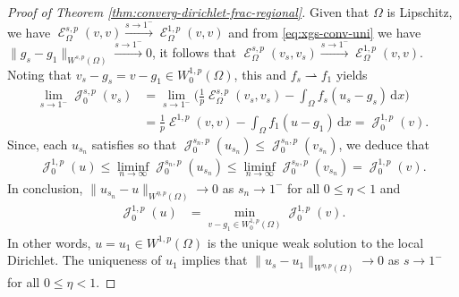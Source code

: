 \documentclass[12pt, reqno]{amsart}%
\theoremstyle{plain}  %
\theoremstyle{definition}  %
\theoremstyle{remark}
\numberwithin{equation}{section}
\DeclareMathOperator{\cE}{\mathcal{E}}
\DeclareMathOperator{\cJ}{\mathcal{J}}
\renewcommand{\d}{\,\mathrm{d}}
\begin{document}
\begin{proof}[Proof of Theorem \ref{thm:converg-dirichlet-frac-regional}]
Given that $\Omega$ is Lipschitz, we have  $ \cE^{s,p}_\Omega(v,v)\xrightarrow{s\to1^-}\cE^{1,p}_\Omega(v,v)$  and from \eqref{eq:xgs-conv-uni} we have $\|g_s-g_1\|_{W^{s,p}(\Omega)}\xrightarrow{s\to1^-}0$, it follows that
$\cE^{s,p}_\Omega(v_s,v_s)
\xrightarrow{s\to 1^-} \cE^{1,p}_\Omega(v,v).$
Noting that $v_s-g_s= v-g_1\in W^{1,p}_0(\Omega)$, this and  $f_{s}\rightharpoonup f_1 $ yields
\begin{align*}
\lim_{s\to1^-}\cJ^{s,p}_0(v_s)
&= \lim_{s\to1^-}\big(\tfrac{1}{p}  \cE^{s,p}_\Omega(v_s, v_s)-\int_\Omega f_{s} (u_{s}-g_{s})\d x \big)\\
&=\tfrac{1}{p}\cE^{1,p}(v,v) -\int_\Omega f_1(u-g_{1})\d x= \cJ^{1,p}_0(v).
\end{align*}
Since, each $u_{s_n}$ satisfies
so that  $\cJ_0^{s_n,p}(u_{s_n})\leq
\cJ_0^{s_n,p}(v_{s_n}) $, we deduce that
\begin{align*}
\cJ^{1,p}_0(u)\leq \liminf_{n\to\infty}\cJ_0^{s_n,p}(u_{s_n})\leq
\liminf_{n\to\infty}\cJ_0^{s_n,p}(v_{s_n})= \cJ^{1,p}_0(v).
\end{align*}
In conclusion, $\|u_{s_n}-u\|_{W^{\eta,p}(\Omega)}\to 0$ as $s_n\to1^-$ for all $0\leq \eta<1$ and
\begin{align*}
\cJ^{1,p}_0(u)&= \min_{v-g_1\in W^{1,p}_0(\Omega)} \cJ^{1,p}_0(v).
\end{align*}
In other words, $u= u_1\in W^{1,p}(\Omega)$ is the unique weak solution to the local  Dirichlet. The uniqueness of $u_1$ implies  that $\|u_{s}-u_1\|_{W^{\eta,p}(\Omega)}\to 0$ as $s\to1^-$ for all $0\leq \eta<1$.
\end{proof}

\appendix
\end{document}
